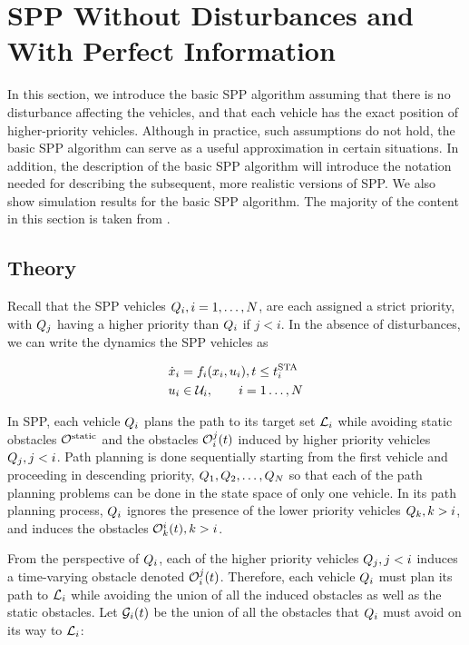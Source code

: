 \section{SPP Without Disturbances and With Perfect Information\label{sec:basic}}
In this section, we introduce the basic SPP algorithm assuming that there is no disturbance affecting the vehicles, and that each vehicle has the exact position of higher-priority vehicles. Although in practice, such assumptions do not hold, the basic SPP algorithm can serve as a useful approximation in certain situations. In addition, the description of the basic SPP algorithm will introduce the notation needed for describing the subsequent, more realistic versions of SPP. We also show simulation results for the basic SPP algorithm. The majority of the content in this section is taken from \cite{Chen15}.

\subsection{Theory}
Recall that the SPP vehicles $Q_i, i=1,\ldots,N$, are each assigned a strict priority, with $Q_j$ having a higher priority than $Q_i$ if $j<i$. In the absence of disturbances, we can write the dynamics the SPP vehicles as

\begin{equation}
\label{eq:dyn_no_dstb}
\begin{aligned}
\dot\state_i &= \fdyn_i(\state_i, \ctrl_i), t \le \sta_i \\
\ctrl_i &\in \cset_i, \qquad i = 1 \ldots, \N
\end{aligned}
\end{equation}


In SPP, each vehicle $Q_i$ plans the path to its target set $\mathcal{L}_i$ while avoiding static obstacles $\mathcal{O}^\text{static}$ and the obstacles $\mathcal{O}_i^j(t)$ induced by higher priority vehicles $Q_j, j<i$. Path planning is done sequentially starting from the first vehicle and proceeding in descending priority, $Q_1, Q_2, \ldots, Q_{N}$ so that each of the path planning problems can be done in the state space of only one vehicle. In its path planning process, $Q_i$ ignores the presence of the lower priority vehicles $Q_k, k>i$, and induces the obstacles $\mathcal{O}_k^i(t), k>i$.

From the perspective of $Q_i$, each of the higher priority vehicles $Q_j, j<i$ induces a time-varying obstacle denoted $\mathcal{O}_i^j(t)$. Therefore, each vehicle $Q_i$ must plan its path to $\mathcal{L}_i$ while avoiding the union of all the induced obstacles as well as the static obstacles. Let $\mathcal{G}_i(t)$ be the union of all the obstacles that $Q_i$ must avoid on its way to $\mathcal{L}_i$:

